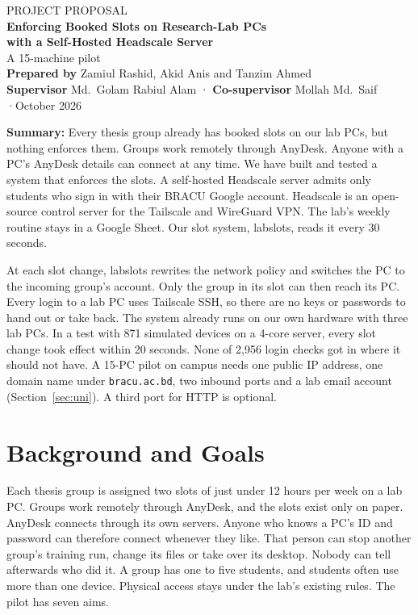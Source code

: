 \documentclass[11pt,a4paper]{article}
\newcommand{\code}[1]{\texttt{#1}}
\begin{document}
\begin{center}
  {\sffamily\small\color{accent} PROJECT PROPOSAL}\\[3pt]
  {\sffamily\bfseries\Large Enforcing Booked Slots on Research-Lab PCs\\[2pt]
   with a Self-Hosted Headscale Server}\\[5pt]
  {\small A 15-machine pilot}\\[6pt]
  {\small \textbf{Prepared by} Zamiul Rashid, Akid Anis and Tanzim Ahmed}\\[2pt]
  {\small \textbf{Supervisor} Md.\ Golam Rabiul Alam \quad·\quad
   \textbf{Co-supervisor} Mollah Md.\ Saif \quad·\quad October 2026}
\end{center}
\vspace{-0.4em}
\suppressfloats[t]

\textbf{Summary:} Every thesis group already has booked slots on our lab PCs,
but nothing enforces them. Groups work remotely through AnyDesk. Anyone with a
PC's AnyDesk details can connect at any time. We have built and tested a system
that enforces the slots. A self-hosted Headscale server admits only students
who sign in with their BRACU Google account. Headscale is an open-source control
server for the Tailscale and WireGuard VPN. The lab's weekly routine stays in a
Google Sheet. Our slot system, labslots, reads it every 30 seconds.

At each slot change, labslots rewrites the network policy and switches the PC to
the incoming group's account. Only the group in its slot can then reach its PC.
Every login to a lab PC uses Tailscale SSH, so there are no keys or passwords to
hand out or take back. The system already runs on our own hardware with three
lab PCs. In a test with 871 simulated devices on a 4-core server, every slot
change took effect within 20 seconds. None of 2,956 login checks got in where it
should not have. A 15-PC pilot on campus needs one public IP address, one domain
name under \code{bracu.ac.bd}, two inbound ports and a lab email account
(Section~\ref{sec:uni}). A third port for HTTP is optional.

\section{Background and Goals}

Each thesis group is assigned two slots of just under 12 hours per week on a
lab PC. Groups work remotely through AnyDesk, and the slots exist only on paper.
AnyDesk connects through its own servers. Anyone who knows a PC's ID and
password can therefore connect whenever they like. That person can stop another
group's training run, change its files or take over its desktop. Nobody can tell
afterwards who did it. A group has one to five students, and students often use
more than one device. Physical access stays under the lab's existing rules. The
pilot has seven aims.
\end{document}
